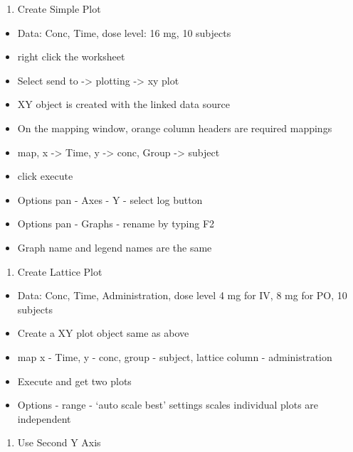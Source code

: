 \documentclass[
  letterpaper,
  DIV=11,
  numbers=noendperiod]{scrreprt}
\providecommand{\tightlist}{%
  \setlength{\itemsep}{0pt}\setlength{\parskip}{0pt}}\usepackage{longtable,booktabs,array}
\begin{document}
\begin{enumerate}
\def\labelenumi{\arabic{enumi}.}
\tightlist
\item
  Create Simple Plot
\end{enumerate}

\begin{itemize}
\tightlist
\item
  Data: Conc, Time, dose level: 16 mg, 10 subjects
\item
  right click the worksheet
\item
  Select send to -\textgreater{} plotting -\textgreater{} xy plot
\item
  XY object is created with the linked data source
\item
  On the mapping window, orange column headers are required mappings
\item
  map, x -\textgreater{} Time, y -\textgreater{} conc, Group
  -\textgreater{} subject
\item
  click execute
\item
  Options pan - Axes - Y - select log button
\item
  Options pan - Graphs - rename by typing F2
\item
  Graph name and legend names are the same
\end{itemize}

\begin{enumerate}
\def\labelenumi{\arabic{enumi}.}
\setcounter{enumi}{1}
\tightlist
\item
  Create Lattice Plot
\end{enumerate}

\begin{itemize}
\tightlist
\item
  Data: Conc, Time, Administration, dose level 4 mg for IV, 8 mg for PO,
  10 subjects
\item
  Create a XY plot object same as above
\item
  map x - Time, y - conc, group - subject, lattice column -
  administration
\item
  Execute and get two plots
\item
  Options - range - `auto scale best' settings scales individual plots
  are independent
\end{itemize}

\begin{enumerate}
\def\labelenumi{\arabic{enumi}.}
\setcounter{enumi}{2}
\tightlist
\item
  Use Second Y Axis
\end{enumerate}
\end{document}
